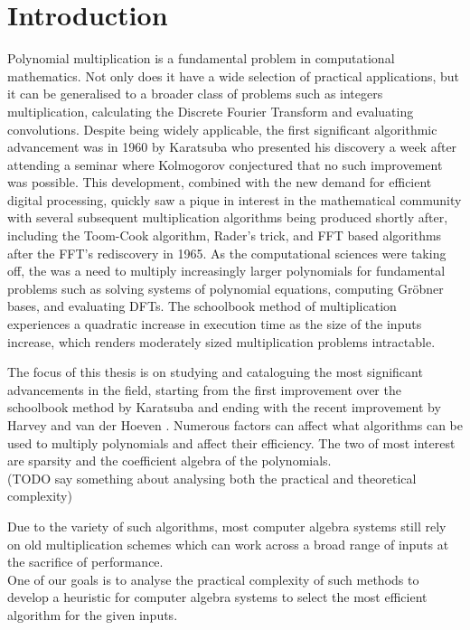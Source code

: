 \chapter{Introduction}\label{introduction}


Polynomial multiplication is a fundamental problem in computational mathematics. Not only does it have a wide selection of practical applications, but it can be generalised to a broader class of problems such as integers multiplication, calculating the Discrete Fourier Transform and evaluating convolutions. Despite being widely applicable, the first significant algorithmic advancement was in 1960 by Karatsuba \cite{karatsuba} who presented his discovery a week after attending a seminar where Kolmogorov conjectured that no such improvement was possible. This development, combined with the new demand for efficient digital processing, quickly saw a pique in interest in the mathematical community with several subsequent multiplication algorithms being produced shortly after, including the Toom-Cook algorithm, Rader's trick, and FFT based algorithms after the FFT's rediscovery in 1965. As the computational sciences were taking off, the was a need to multiply increasingly larger polynomials for fundamental problems such as solving systems of polynomial equations, computing Gr\"{o}bner bases, and evaluating DFTs. The schoolbook method of multiplication experiences a quadratic increase in execution time as the size of the inputs increase, which renders moderately sized multiplication problems intractable.

\medskip

The focus of this thesis is on studying and cataloguing the most significant advancements in the field, starting from the first improvement over the schoolbook method by Karatsuba and ending with the recent improvement by Harvey and van der Hoeven \cite{nlogn}. Numerous factors can affect what algorithms can be used to multiply polynomials and affect their efficiency. The two of most interest are sparsity and the coefficient algebra of the polynomials.\\

(TODO say something about analysing both the practical and theoretical complexity)

Due to the variety of such algorithms, most computer algebra systems still rely on old multiplication schemes which can work across a broad range of inputs at the sacrifice of performance.\\
One of our goals is to analyse the practical complexity of such methods to develop a heuristic for computer algebra systems to select the most efficient algorithm for the given inputs.

